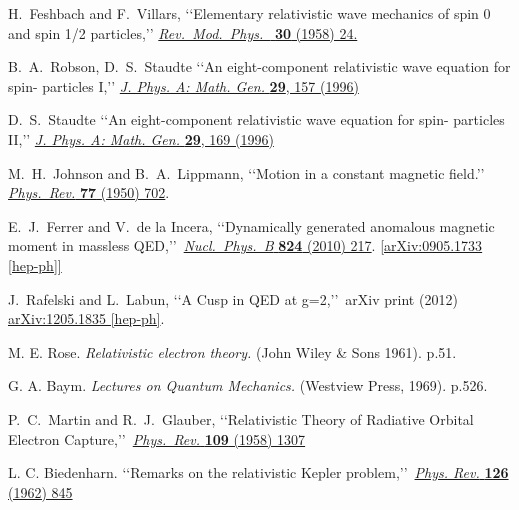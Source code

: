\documentclass[epj]{svjour}
\begin{document}
\begin{thebibliography}{99}
 H.~Feshbach and F.~Villars,
 \lq\lq Elementary relativistic wave mechanics of spin 0 and spin 1/2 particles,\rq\rq
 \href{https://doi.org/10.1103/RevModPhys.30.24}{\emph{Rev.\ Mod.\ Phys.\ } {\bf 30} (1958) 24.}

 B.~A.~Robson, D.~S.~Staudte
 \lq\lq An eight-component relativistic wave equation for spin- particles I,\rq\rq
 \href{https://doi.org/10.1088/0305-4470/29/1/017}{\emph{J. Phys. A: Math. Gen.} {\bf 29}, 157 (1996)}

 D.~S.~Staudte
 \lq\lq An eight-component relativistic wave equation for spin- particles II,\rq\rq
 \href{https://doi.org/10.1088/0305-4470/29/1/018}{\emph{J. Phys. A: Math. Gen.} {\bf 29}, 169 (1996)}


 M.~H.~Johnson and B.~A.~Lippmann,
 \lq\lq Motion in a constant magnetic field.\rq\rq\ 
 \href{https://doi.org/10.1103/PhysRev.76.828}{\emph{ Phys.\ Rev.} {\bf 77} (1950) 702}. 

 E.~J.~Ferrer and V.~de la Incera,
 \lq\lq Dynamically generated anomalous magnetic moment in massless QED,\rq\rq\ 
 \href{https://doi.org/10.1016/j.nuclphysb.2009.08.024}{\emph{Nucl.\ Phys.\ B} {\bf 824} (2010) 217}.
 \href{http://arxiv.org/abs/0905.1733}{[arXiv:0905.1733 [hep-ph]]}

 J.~Rafelski and L.~Labun,
 \lq\lq A Cusp in QED at g=2,\rq\rq\ arXiv print (2012) 
\href{https://arxiv.org/abs/1205.1835}{arXiv:1205.1835 [hep-ph]}. 

\bibitem{r61}
 M. E. Rose. 
 \emph{Relativistic electron theory.}
 (John Wiley \& Sons 1961). p.51.

 G. A. Baym.
 \emph{Lectures on Quantum Mechanics.}
 (Westview Press, 1969). p.526. 

 P.~C.~Martin and R.~J.~Glauber,
 \lq\lq Relativistic Theory of Radiative Orbital Electron Capture,\rq\rq\ 
 \href{https://doi.org/10.1103/PhysRev.109.1307}{\emph{Phys.\ Rev.} {\bf 109} (1958) 1307}
 
\bibitem{bi62}
 L. C. Biedenharn. 
 \lq\lq Remarks on the relativistic Kepler problem,\rq\rq\ 
 \href{https://doi.org/10.1103/PhysRev.126.845}{\emph{Phys. Rev.} {\bf 126} (1962) 845}


\end{thebibliography}
\end{document}

